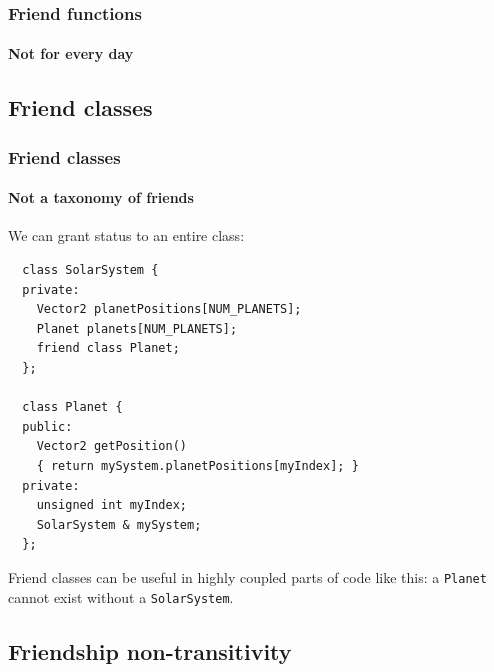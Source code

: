 \documentclass{beamer}
\begin{document}
\begin{frame}[fragile]
  \frametitle{Friend functions}
  \framesubtitle{Not for every day}
  

\end{frame}


\subsection{Friend classes}

\begin{frame}[fragile]
  \frametitle{Friend classes}
  \framesubtitle{Not a taxonomy of friends}
  
  We can grant  status to an entire class:
  \begin{lstlisting}
  class SolarSystem {
  private:
    Vector2 planetPositions[NUM_PLANETS];
    Planet planets[NUM_PLANETS];
    friend class Planet;
  };
  
  class Planet {
  public:
    Vector2 getPosition()
    { return mySystem.planetPositions[myIndex]; }
  private:
    unsigned int myIndex;
    SolarSystem & mySystem;
  };
  \end{lstlisting}
  \pause
  Friend classes can be useful in highly coupled parts of code like this: a \texttt{Planet} cannot exist without a \texttt{SolarSystem}.
  
\end{frame}

\subsection{Friendship non-transitivity}
\end{document}
